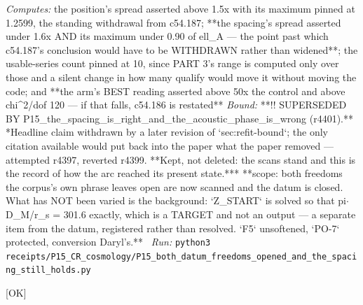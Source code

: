 \begin{description}
\emph{Computes:} the position's spread asserted above 1.5x with its maximum pinned at 1.2599, the standing withdrawal from c54.187; **the spacing's spread asserted under 1.6x AND its maximum under 0.90 of ell\_A --- the point past which c54.187's conclusion would have to be WITHDRAWN rather than widened**; the usable-series count pinned at 10, since PART 3's range is computed only over those and a silent change in how many qualify would move it without moving the code; and **the arm's BEST reading asserted above 50x the control and above chi\textasciicircum{}2/dof 120 --- if that falls, c54.186 is restated**
 \emph{Bound:} **!! SUPERSEDED BY P15\_the\_spacing\_is\_right\_and\_the\_acoustic\_phase\_is\_wrong (r4401).** *Headline claim withdrawn by a later revision of `sec:refit-bound`; the only citation available would put back into the paper what the paper removed --- attempted r4397, reverted r4399. **Kept, not deleted: the scans stand and this is the record of how the arc reached its present state.*** **scope: both freedoms the corpus's own phrase leaves open are now scanned and the datum is closed. What has NOT been varied is the background: `Z\_START` is solved so that pi\ensuremath{\cdot}D\_M/r\_s = 301.6 exactly, which is a TARGET and not an output --- a separate item from the datum, registered rather than resolved. `F5` unsoftened, `PO-7` protected, conversion Daryl's.**
\ \emph{Run:} \texttt{python3 receipts/P15\_CR\_cosmology/P15\_both\_datum\_freedoms\_opened\_and\_the\_spacing\_still\_holds.py}
\item[\label{rcpt:P15_the_floor_is_a_distance_between_models_not_a_number_from_the_data}\texttt{P15\_the\_floor\_is\_a\_distance\_between\_models\_not\_a\_number\_from\_the\_data}]\hfill\textsf{[OK]}\\

\end{description}
